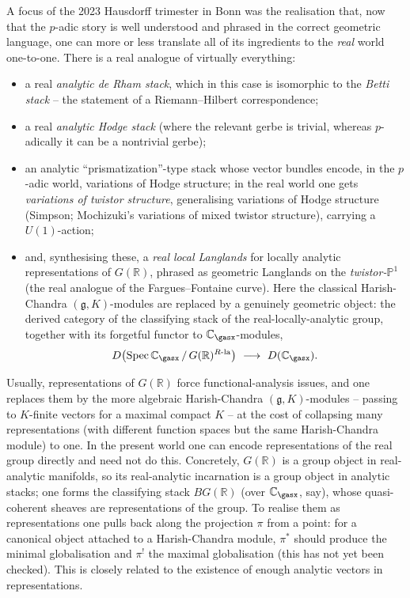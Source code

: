 A focus of the 2023 Hausdorff trimester in Bonn was the realisation that, now
that the $p$-adic story is well understood and phrased in the correct geometric
language, one can more or less translate all of its ingredients to the
\emph{real} world one-to-one. There is a real analogue of virtually everything:
\begin{itemize}
\item a real \emph{analytic de Rham stack}, which in this case is isomorphic to
the \emph{Betti stack} -- the statement of a Riemann--Hilbert correspondence;
\item a real \emph{analytic Hodge stack} (where the relevant gerbe is trivial,
whereas $p$-adically it can be a nontrivial gerbe);
\item an analytic ``prismatization''-type stack whose vector bundles encode, in
the $p$-adic world, variations of Hodge structure; in the real world one gets
\emph{variations of twistor structure}, generalising variations of Hodge
structure (Simpson; Mochizuki's variations of mixed twistor structure), carrying
a $U(1)$-action;
\item and, synthesising these, a \emph{real local Langlands} for locally
analytic representations of $G(\mathbb R)$, phrased as geometric Langlands on the
\emph{twistor-$\mathbb P^1$} (the real analogue of the Fargues--Fontaine curve).
Here the classical Harish-Chandra $(\mathfrak g,K)$-modules are replaced by a
genuinely geometric object: the derived category of the classifying stack of the
real-locally-analytic group, together with its forgetful functor to
$\mathbb C_{\gasx}$-modules,
\begin{equation*}
D\bigl(\operatorname{Spec}\mathbb C_{\gasx}\,/\,G(\mathbb R)^{R\text{-}\mathrm{la}}\bigr)\ \longrightarrow\ D(\mathbb C_{\gasx}).
\end{equation*}
\end{itemize}

\begin{remark}
\label{rmk:24:real-reps}
Usually, representations of $G(\mathbb R)$ force functional-analysis issues, and
one replaces them by the more algebraic Harish-Chandra
$(\mathfrak g,K)$-modules -- passing to $K$-finite vectors for a maximal compact
$K$ -- at the cost of collapsing many representations (with different function
spaces but the same Harish-Chandra module) to one. In the present world one can
encode representations of the real group directly and need not do this. Concretely,
$G(\mathbb R)$ is a group object in real-analytic manifolds, so its
real-analytic incarnation is a group object in analytic stacks; one forms the
classifying stack $BG(\mathbb R)$ (over $\mathbb C_{\gasx}$, say), whose
quasi-coherent sheaves are representations of the group. To realise them as
representations one pulls back along the projection $\pi$ from a point: for a
canonical object attached to a Harish-Chandra module, $\pi^*$ should produce the
minimal globalisation and $\pi^!$ the maximal globalisation (this has not yet
been checked). This is closely related to the existence of enough analytic
vectors in representations.
\end{remark}

